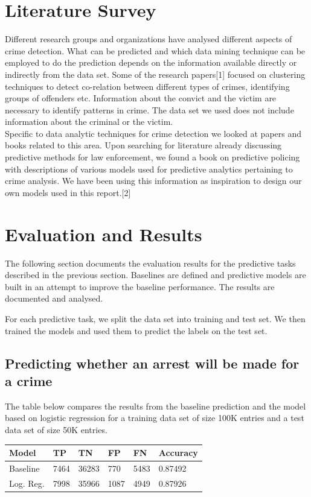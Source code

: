 \documentclass[journal]{IEEEtran}
\begin{document}
\section{Literature Survey}

Different research groups and organizations have analysed different aspects of crime detection. What can be predicted and which data mining technique can be employed to do the prediction depends on the information available directly or indirectly from the data set.  Some of the research papers[1] focused on clustering techniques to detect co-relation between different types of crimes, identifying groups of offenders etc.  Information about the convict and the victim are necessary to identify patterns in crime. The data set we used does not include information about the criminal or the victim.\\ 

Specific to data analytic techniques for crime detection we looked at papers and books related to this area. Upon searching for literature already discussing predictive methods for law enforcement, we found a book on predictive policing with descriptions of various models used for predictive analytics pertaining to crime analysis. We have been using this information as inspiration to design our own models used in this report.[2]

\section{Evaluation and Results}
The following section documents the evaluation results for the predictive tasks described in the previous section. Baselines are defined and predictive models are built in an attempt to improve the baseline performance.  The  results are documented and analysed. 

For each predictive task, we split the data set into training and test set. We then trained the models and used them to predict the labels on the test set.

\subsection{Predicting whether an arrest will be made for a crime}
The table below compares the results from the baseline prediction and the model based on logistic regression for a training data set of size 100K entries and a test data set of size 50K entries.

\begin{center}
\begin{tabular}{| l | l | l | l | l | l |}\hline
Model & TP & TN & FP & FN & Accuracy\\ \hline
Baseline & 7464 & 36283 & 770 & 5483 & 0.87492\\ \hline
Log. Reg. & 7998 & 35966 & 1087 & 4949 & 0.87926\\ \hline
\end{tabular}
\end{center}
\end{document}
